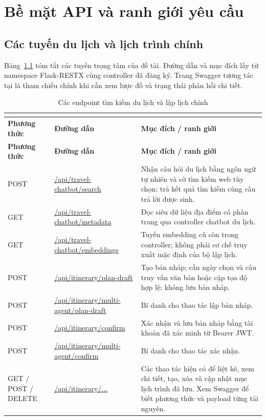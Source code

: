 \chapter{Bề mặt API và ranh giới yêu cầu}
\label{app:api}

\section{Các tuyến du lịch và lịch trình chính}

Bảng~\ref{tab:core_api} tóm tắt các tuyến trọng tâm của đề tài. Đường dẫn và mục đích lấy từ namespace Flask-RESTX cùng controller đã đăng ký. Trang Swagger tương tác tại  là tham chiếu chính khi cần xem lược đồ và trạng thái phản hồi chi tiết.

\begin{longtable}{>{\raggedright\arraybackslash}p{2.3cm} >{\raggedright\arraybackslash}p{5.0cm} >{\raggedright\arraybackslash}p{6.0cm}}
\caption{Các endpoint tìm kiếm du lịch và lập lịch chính}\\
\label{tab:core_api}\\
\toprule
\textbf{Phương thức} & \textbf{Đường dẫn} & \textbf{Mục đích / ranh giới}\\
\midrule
\endfirsthead
\toprule
\textbf{Phương thức} & \textbf{Đường dẫn} & \textbf{Mục đích / ranh giới}\\
\midrule
\endhead
POST & \url{/api/travel-chatbot/search} & Nhận câu hỏi du lịch bằng ngôn ngữ tự nhiên và cờ tìm kiếm web tùy chọn; trả kết quả tìm kiếm cùng câu trả lời được sinh.\\
GET & \url{/api/travel-chatbot/metadata} & Đọc siêu dữ liệu địa điểm có phân trang qua controller chatbot du lịch.\\
GET & \url{/api/travel-chatbot/embeddings} & Tuyến embedding cũ còn trong controller; không phải cơ chế truy xuất mặc định của bộ lập lịch.\\
POST & \url{/api/itinerary/plan-draft} & Tạo bản nháp; cần ngày chọn và câu truy vấn văn bản hoặc cặp tọa độ hợp lệ; không lưu bản nháp.\\
POST & \url{/api/itinerary/multi-agent/plan-draft} & Bí danh cho thao tác lập bản nháp.\\
POST & \url{/api/itinerary/confirm} & Xác nhận và lưu bản nháp bằng tài khoản đã xác minh từ Bearer JWT.\\
POST & \url{/api/itinerary/multi-agent/confirm} & Bí danh cho thao tác xác nhận.\\
GET / POST / DELETE & \url{/api/itinerary/...} & Các thao tác hiện có để liệt kê, xem chi tiết, tạo, xóa và cập nhật mục lịch trình đã lưu. Xem Swagger để biết phương thức và payload từng tài nguyên.\\
\bottomrule
\end{longtable}

